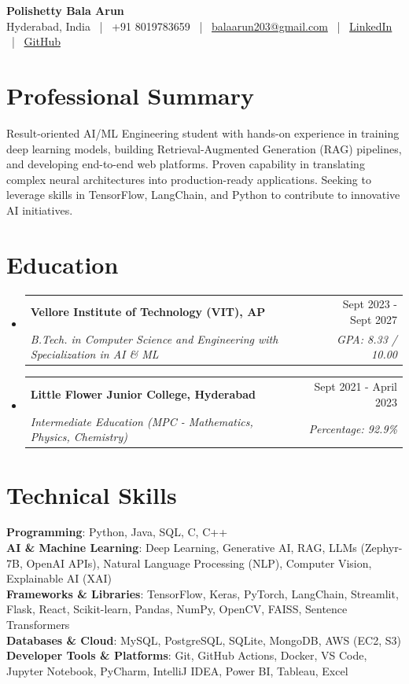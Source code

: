 \documentclass[letterpaper,10pt]{article}
\makeatletter
\newcommand{\resumeSubheading}[4]{
  \vspace{-2pt}\item
    \begin{tabular*}{0.97\textwidth}[t]{l@{\extracolsep{\fill}}r}
      \textbf{#1} & #2 \\
      \textit{\small#3} & \textit{\small #4} \\
    \end{tabular*}\vspace{-7pt}
}
\newcommand{\resumeSubHeadingListStart}{\begin{itemize}[leftmargin=0.15in, label={}]}
\newcommand{\resumeSubHeadingListEnd}{\end{itemize}}
\makeatother
\begin{document}
\begin{center}
    {\Huge \textbf{Polishetty Bala Arun}} \\ \vspace{3pt}
    \small Hyderabad, India ~|~ +91 8019783659 ~|~
    \href{mailto:balaarun203@gmail.com}{balaarun203@gmail.com} ~|~
    \href{https://www.linkedin.com/in/polishetty-bala-arun/}{LinkedIn} ~|~
    \href{https://github.com/PolishettyBalaArun}{GitHub}
\end{center}

\section{Professional Summary}
Result-oriented AI/ML Engineering student with hands-on experience in training deep learning models, building Retrieval-Augmented Generation (RAG) pipelines, and developing end-to-end web platforms. Proven capability in translating complex neural architectures into production-ready applications. Seeking to leverage skills in TensorFlow, LangChain, and Python to contribute to innovative AI initiatives.

\section{Education}
\resumeSubHeadingListStart
  \resumeSubheading
    {Vellore Institute of Technology (VIT), AP}{Sept 2023 - Sept 2027}
    {B.Tech. in Computer Science and Engineering with Specialization in AI \& ML}{GPA: 8.33 / 10.00}
  \resumeSubheading
    {Little Flower Junior College, Hyderabad}{Sept 2021 - April 2023}
    {Intermediate Education (MPC - Mathematics, Physics, Chemistry)}{Percentage: 92.9\%}
\resumeSubHeadingListEnd

\section{Technical Skills}
\begin{itemize}[leftmargin=0.15in, label={}]
    \small{\item{
      \textbf{Programming}: {Python, Java, SQL, C, C++}\\
      \textbf{AI \& Machine Learning}: {Deep Learning, Generative AI, RAG, LLMs (Zephyr-7B, OpenAI APIs), Natural Language Processing (NLP), Computer Vision, Explainable AI (XAI)}\\
      \textbf{Frameworks \& Libraries}: {TensorFlow, Keras, PyTorch, LangChain, Streamlit, Flask, React, Scikit-learn, Pandas, NumPy, OpenCV, FAISS, Sentence Transformers}\\
      \textbf{Databases \& Cloud}: {MySQL, PostgreSQL, SQLite, MongoDB, AWS (EC2, S3)}\\
      \textbf{Developer Tools \& Platforms}: {Git, GitHub Actions, Docker, VS Code, Jupyter Notebook, PyCharm, IntelliJ IDEA, Power BI, Tableau, Excel}\\
    }}
\end{itemize}
\end{document}

